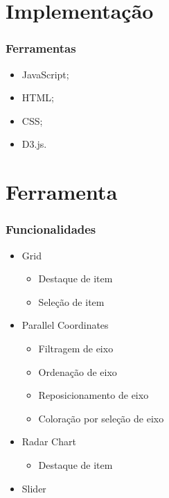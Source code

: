 \documentclass{beamer}
\begin{document}
\section{Implementação} %

\begin{frame}
\frametitle{Ferramentas}
\begin{itemize}
\item JavaScript;
\item HTML;
\item CSS;
\item D3.js.
\end{itemize}
\end{frame}

\section{Ferramenta} %

\begin{frame}
\frametitle{Funcionalidades}
\begin{itemize}
\item Grid
  \begin{itemize}
  \item Destaque de item
  \item Seleção de item
  \end{itemize}
\item Parallel Coordinates
  \begin{itemize}
  \item Filtragem de eixo
  \item Ordenação de eixo
  \item Reposicionamento de eixo
  \item Coloração por seleção de eixo
  \end{itemize}
\item Radar Chart
  \begin{itemize}
  \item Destaque de item
  \end{itemize}
\item Slider
\end{itemize}
\end{frame}
\end{document}
